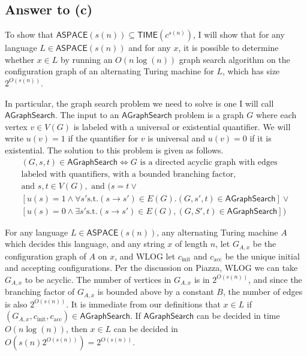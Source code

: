 \documentclass{article}
\newcommand{\TIME}{\mathbf{TIME}}
\def \ASPACE{{\mathsf{ASPACE}}}
\def \TIME{{\mathsf{TIME}}}
\begin{document}

\subsection*{Answer to (c)}
To show that $\ASPACE(s(n)) \subseteq \TIME(c^{s(n)})$, I will show that for any language $L \in \ASPACE(s(n))$ and for any $x$, it is possible to determine whether $x \in L$ by running an $O(n \log(n))$ graph search algorithm on the configuration graph of an alternating Turing machine for $L$, which has size $2^{O(s(n))}$.

In particular, the graph search problem we need to solve is one I will call $\mathsf{AGraphSearch}$.  The input to an $\mathsf{AGraphSearch}$ problem is a graph $G$ where each vertex $v \in V(G)$ is labeled with a universal or existential quantifier.  We will write $u(v) = 1$ if the quantifier for $v$ is universal and $u(v) = 0$ if it is existential.  The solution to this problem is given as follows.
\begin{multline*}
(G, s, t) \in \mathsf{AGraphSearch} \iff G \text{ is a directed acyclic graph with edges}\\ \text{labeled with quantifiers, with a bounded branching factor},\\
\text{and } s, t \in V(G), \text{ and } ( s = t \vee \\
[u(s) = 1 \wedge \forall s' \text{s.t.} (s \to s') \in E(G) . (G, s', t) \in \mathsf{AGraphSearch}] \vee \\
[u(s) = 0 \wedge \exists s' \text{s.t.} (s \to s') \in E(G) , (G, S', t) \in \mathsf{AGraphSearch}]
)
\end{multline*}

For any language $L \in \ASPACE(s(n))$, any alternating Turing machine $A$ which decides this language, and any string $x$ of length $n$, let $G_{A, x}$ be the configuration graph of $A$ on $x$, and WLOG let $c_\text{init}$ and $c_\text{acc}$ be the unique initial and accepting configurations. Per the discussion on Piazza, WLOG we can take $G_{A, x}$ to be acyclic.
The number of vertices in $G_{A, x}$ is in $2^{O(s(n))}$, and since the branching factor of $G_{A, x}$ is bounded above by a constant $B$, the number of edges is also $2^{O(s(n))}$.
It is immediate from our definitions that $x \in L$ if $(G_{A, x}, c_\text{init}, c_\text{acc}) \in \mathsf{AGraphSearch}$.
If $\mathsf{AGraphSearch}$ can be decided in time $O(n \log(n))$,
then $x \in L$ can be decided in $O(s(n) 2^{O(s(n))}) = 2^{O(s(n))}$.
\end{document}
